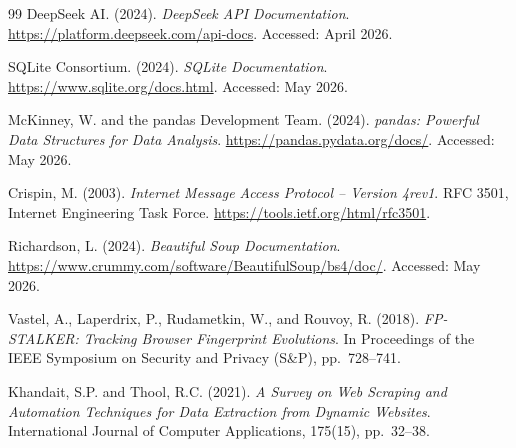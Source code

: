\documentclass[12pt, a4paper, oneside]{report}
\begin{document}
\begin{thebibliography}{99}
DeepSeek AI. (2024). \textit{DeepSeek API Documentation}.
\url{https://platform.deepseek.com/api-docs}. Accessed: April 2026.

SQLite Consortium. (2024). \textit{SQLite Documentation}.
\url{https://www.sqlite.org/docs.html}. Accessed: May 2026.

McKinney, W. and the pandas Development Team. (2024). \textit{pandas: Powerful Data Structures for Data Analysis}.
\url{https://pandas.pydata.org/docs/}. Accessed: May 2026.

Crispin, M. (2003). \textit{Internet Message Access Protocol -- Version 4rev1}.
RFC 3501, Internet Engineering Task Force. \url{https://tools.ietf.org/html/rfc3501}.

Richardson, L. (2024). \textit{Beautiful Soup Documentation}.
\url{https://www.crummy.com/software/BeautifulSoup/bs4/doc/}. Accessed: May 2026.

Vastel, A., Laperdrix, P., Rudametkin, W., and Rouvoy, R. (2018).
\textit{FP-STALKER: Tracking Browser Fingerprint Evolutions}.
In Proceedings of the IEEE Symposium on Security and Privacy (S\&P), pp.~728--741.

Khandait, S.P. and Thool, R.C. (2021).
\textit{A Survey on Web Scraping and Automation Techniques for Data Extraction from Dynamic Websites}.
International Journal of Computer Applications, 175(15), pp.~32--38.

\end{thebibliography}
\end{document}
